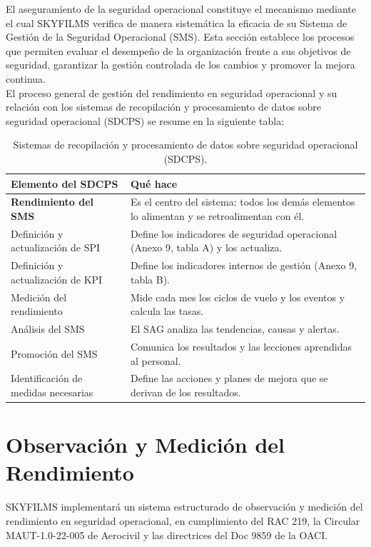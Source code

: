 El aseguramiento de la seguridad operacional constituye el mecanismo mediante el cual SKYFILMS verifica de manera sistemática la eficacia de su Sistema de Gestión de la Seguridad Operacional (SMS). Esta sección establece los procesos que permiten evaluar el desempeño de la organización frente a sus objetivos de seguridad, garantizar la gestión controlada de los cambios y promover la mejora continua.\\

El proceso general de gestión del rendimiento en seguridad operacional y su relación con los sistemas de recopilación y procesamiento de datos sobre seguridad operacional (SDCPS) se resume en la siguiente tabla:

\begin{table}[H]
\centering
\renewcommand{\arraystretch}{1.35}
\begin{tabularx}{\textwidth}{|>{\RaggedRight\arraybackslash}p{4.6cm}|>{\RaggedRight\arraybackslash}X|}
\hline
\rowcolor[gray]{0.9}\textbf{Elemento del SDCPS} & \textbf{Qué hace} \\ \hline
\rowcolor[HTML]{FFE04D}\textbf{Rendimiento del SMS} & Es el centro del sistema: todos los demás elementos lo alimentan y se retroalimentan con él. \\ \hline
Definición y actualización de SPI & Define los indicadores de seguridad operacional (Anexo 9, tabla A) y los actualiza. \\ \hline
Definición y actualización de KPI & Define los indicadores internos de gestión (Anexo 9, tabla B). \\ \hline
Medición del rendimiento & Mide cada mes los ciclos de vuelo y los eventos y calcula las tasas. \\ \hline
Análisis del SMS & El SAG analiza las tendencias, causas y alertas. \\ \hline
Promoción del SMS & Comunica los resultados y las lecciones aprendidas al personal. \\ \hline
Identificación de medidas necesarias & Define las acciones y planes de mejora que se derivan de los resultados. \\ \hline
\end{tabularx}
\caption{Sistemas de recopilación y procesamiento de datos sobre seguridad operacional (SDCPS).}
\end{table}


\section{Observación y Medición del Rendimiento}
SKYFILMS implementará un sistema estructurado de observación y medición del rendimiento en seguridad operacional, en cumplimiento del RAC 219, la Circular MAUT-1.0-22-005 de Aerocivil y las directrices del Doc 9859 de la OACI.

